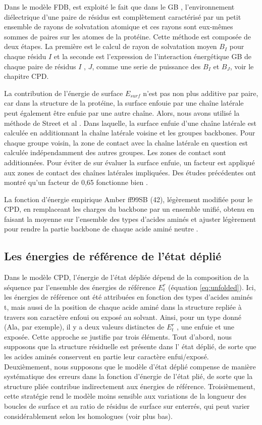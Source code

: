 Dans le modèle FDB, est exploité le fait que dans le GB , l'environnement diélectrique d'une paire de résidus est complètement caractérisé par un petit ensemble de rayons de solvatation atomique et ces rayons sont eux-mêmes sommes de paires sur les atomes de la protéine. Cette méthode est composée de deux étapes. La première est le calcul de rayon de solvatation moyen $B_I$ pour chaque résidu $I$ et la seconde est l'expression de l'interaction énergétique GB de chaque paire de résidus $I$ , $J$, comme une serie de puissance des  $B_I$  et $B_J$, voir le chapitre CPD. 

La contribution de l'énergie de surface $E_{surf}$ n'est pas non plus additive par paire, car dans la structure de la protéine, la surface enfouie par une chaîne latérale peut également être enfuie par une autre chaîne. Alors, nous avons utilisé la méthode de Street et al \cite{Street98}. Dans laquelle, la surface enfuie d'une chaîne latérale est calculée en additionnant la chaîne latérale voisine et les groupes backbones. Pour chaque groupe voisin, la zone de contact avec la chaîne latérale en question est calculée indépendamment des autres groupes. Les zones de contact sont additionnées. Pour éviter de sur évaluer la surface enfuie, un facteur est appliqué aux zones de contact des chaînes latérales impliquées. Des études précédentes ont montré qu'un facteur de 0,65 fonctionne bien \cite{Lopes07,Gaillard14}.  

La fonction d'énergie empirique Amber ff99SB (42), légèrement modifiée pour le CPD, en remplaceant les charges du backbone par un ensemble unifié, obtenu en faisant la moyenne sur l'ensemble des types  d'acides aminés et ajuster légèrement pour rendre la partie backbone de chaque acide aminé neutre \cite{Aleksandrov10b}.

\subsection{Les énergies de référence de l'état déplié}

Dans le modèle CPD, l'énergie de l'état dépliée dépend de la composition de la séquence par l'ensemble des énergies de référence $E^r_t$ (équation \ref{eq:unfolded}). Ici, les énergies de référence ont été attribuées en fonction des types d'acides aminés t, mais aussi de la position de chaque acide aminé dans la structure repliée à travers son caractère enfoui ou exposé au solvant. Ainsi, pour un type donné (Ala, par exemple), il y a deux valeurs distinctes de $E^r_t$ , une enfuie et une exposée. Cette approche se justifie par trois éléments. Tout d'abord, nous supposons que la structure résiduelle est présente dans l' état déplié, de sorte que les acides aminés conservent en partie leur caractère enfui/exposé. Deuxièmement, nous supposons que le modèle d'état déplié compense de manière systématique des erreurs dans la fonction d'énergie de l'état plié, de sorte que  la structure pliée contribue indirectement aux énergies de référence. Troisièmement, cette stratégie rend le modèle moins sensible aux variations de la longueur des boucles de surface et au ratio  de résidus de surface sur  enterrés, qui peut varier considérablement selon les homologues (voir plus bas).  

